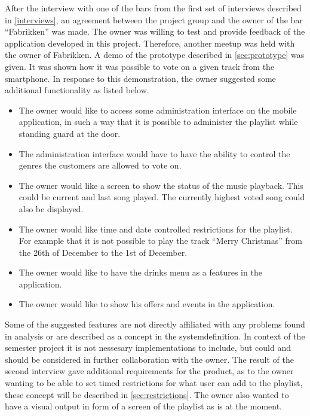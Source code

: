 \label{sec:fabrikken}
After the interview with one of the bars from the first set of interviews described in \cref{interviews}, an agreement between the project group and the owner of the bar \enquote{Fabrikken} was made. The owner was willing to test and provide feedback of the application developed in this project. Therefore, another meetup was held with the owner of Fabrikken. A demo of the prototype described in \cref{sec:prototype} was given. It was shown how it was possible to vote on a given track from the smartphone. In response to this demonstration, the owner suggested some additional functionality as listed below.

\begin{itemize}
    \item{The owner would like to access some administration interface on the mobile application, in such a way that it is possible to administer the playlist while standing guard at the door.}
    \item{The administration interface would have to have the ability to control the genres the customers are allowed to vote on.}
    \item{The owner would like a screen to show the status of the music playback. This could be current and last song played. The currently highest voted song could also be displayed.}
    \item{The owner would like time and date controlled restrictions for the playlist. For example that it is not possible to play the track \enquote{Merry Christmas} from the 26th of December to the 1st of December.}
    \item{The owner would like to have the drinks menu as a features in the application.}
    \item{The owner would like to show his offers and events in the application.}
\end{itemize}

Some of the suggested features are not directly affiliated with any problems found in analysis or are described as a concept in the systemdefinition. In context of the semester project it is not nessesary implementations to include, but could and should be considered in further collaboration with the owner. The result of the second interview gave additional requirements for the product, as to the owner wanting to be able to set timed restrictions for what user can add to the playlist, these concept will be described in \cref{sec:restrictions}. The owner also wanted to have a visual output in form of a screen of the playlist as is at the moment.
